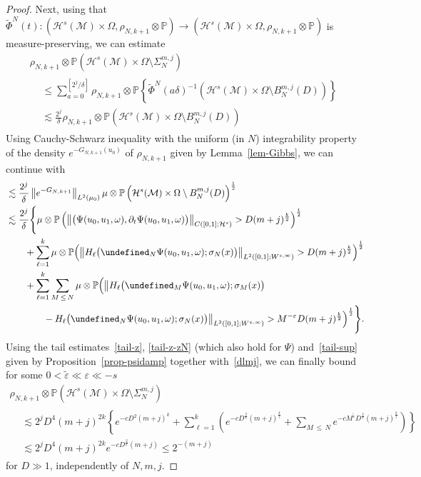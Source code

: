 \documentclass[10pt]{amsart}
\theoremstyle{definition}\newtheorem{defi}[theo]{Definition}\newtheorem{rema}[theo]{Remark}\newtheorem{exam}[theo]{Example}\newtheorem{exem}[theo]{Example}\newtheorem{nota}[theo]{Notation}
\newcommand{\Prob}{\mathbb{P}}
\let\P= \undefined
\newcommand{\P}{\mathbf{P}}
\newcommand{\M}{\mathcal{M}}
\renewcommand{\H}{\mathcal{H}}
\newcommand{\dl}{\delta}
\newcommand{\eps}{\varepsilon}
\newcommand{\s}{\sigma}
\newcommand{\Si}{\Sigma}
\newcommand{\wt}{\widetilde}
\newcommand{\dt}{\partial_t}
\renewcommand{\o}{\omega}
\renewcommand{\O}{\Omega}
\newcommand{\les}{\lesssim}
\begin{document}
\begin{proof}
Next, using that $\wt\Phi^N(t): (\H^s(\M)\times \O,\rho_{N,k+1}\otimes\Prob) \to (\H^s(\M)\times \O,\rho_{N,k+1}\otimes\Prob)$ is measure-preserving, we can estimate
\begin{multline*}
\rho_{N,k+1}\otimes\Prob\left(\H^s(\M)\times\O\setminus\Si_{N}^{m,j}\right)\\
\begin{aligned}
&\leq \sum_{a=0}^{\left[2^j/\dl\right]}\rho_{N,k+1}\otimes\Prob\left\{\wt\Phi^N(a\dl)^{-1}\left(\H^s(\M)\times\O\setminus B_N^{m,j}(D)\right)\right\}\\
&\les \frac{2^j}{\dl}\rho_{N,k+1}\otimes\Prob\left(\H^s(\M)\times\O\setminus B_N^{m,j}(D)\right)
\end{aligned}
\end{multline*}
Using Cauchy-Schwarz inequality with the uniform (in $N$) integrability property of the density $e^{-G_{N,k+1}(u_0)}$ of $\rho_{N,k+1}$ given by Lemma~\ref{lem-Gibbs}, we can continue with
\begin{align*}
&\les\frac{2^j}{\dl}\left\|e^{-G_{N,k+1}}\right\|_{L^2(\mu_0)}\mu\otimes\Prob\left(\H^s(\M)\times\O\setminus B_N^{m,j}(D)\right)^{\frac12}\\
&\les\frac{2^j}{\dl}\Bigg\{\mu\otimes\Prob\left(\left\|\big(\Psi(u_0,u_1,\o),\dt\Psi(u_0,u_1,\o)\big)\right\|_{C\left([0,1];\H^s\right)} > D(m+j)^{\frac{k}2}\right)^{\frac12}\\
&\qquad + \sum_{\ell=1}^k\mu\otimes\Prob\Big(\big\|H_{\ell}\big(\P_N\Psi(u_0,u_1,\o);\s_N(x)\big)\big\|_{L^2([0,1];W^{s,\infty})}> D(m+j)^{\frac{k}2}\Big)^{\frac12}\\
&\qquad+\sum_{\ell=1}^k\sum_{M\,\le\,N}\mu\otimes\Prob\Big(\big\|H_{\ell}\big(\P_M\Psi(u_0,u_1,\o);\s_M(x)\big)\\
&\qquad\qquad-H_{\ell}\big(\P_N\Psi(u_0,u_1,\o);\s_N(x)\big)\big\|_{L^2([0,1];W^{s,\infty})}\notag > M^{-\eps}D(m+j)^{\frac{k}2}\Big)^{\frac12}\Bigg\}.
\end{align*}
Using the tail estimates~\eqref{tail-z}, \eqref{tail-z-zN} (which also hold for $\Psi$) and~\eqref{tail-sup} given by Proposition~\ref{prop-psidamp} together with~\eqref{dlmj}, we can finally bound for some $0<\wt\eps\ll\eps\ll -s$
\begin{multline}\label{Si1}
\rho_{N,k+1}\otimes\Prob\left(\H^s(\M)\times\O\setminus\Si_{N}^{m,j}\right)\\
\begin{aligned}
&\les 2^jD^{4}(m+j)^{2k}\left\{ e^{-cD^2(m+j)^k}
+\sum_{\ell=1}^k\left(e^{-cD^{\frac2\ell}(m+j)^{\frac{k}\ell}}+\sum_{M\,\le\,N}e^{-cM^{\wt\eps}D^{\frac2\ell}(m+j)^{\frac{k}\ell}}\right)\right\}\\
&\les 2^jD^{4}(m+j)^{2k}e^{-cD^{\frac2k}(m+j)}\le 2^{-(m+j)}
\end{aligned}
\end{multline}
for $D\gg 1$, independently of $N,m,j$.


\end{proof}
\end{document}
